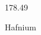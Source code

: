 \documentclass[12pt]{article}
\begin{document}
\hfill{}
\vfill
\begin{center}
  {\fontsize{50}{60}
  }

  178.49

Hafnium
\end{center}
\vfill
\end{document}
